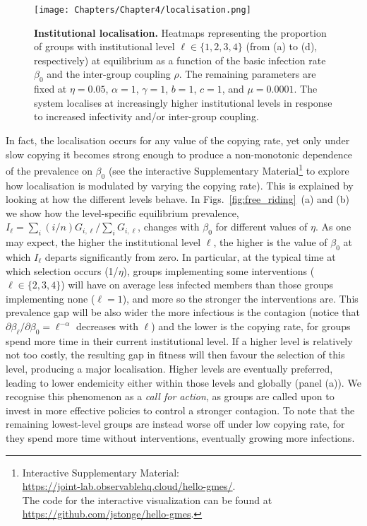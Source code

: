 \begin{figure}
  \centering	
    \texttt{[image: Chapters/Chapter4/localisation.png]}  
  \caption[Institutional localisation]{  \textbf{Institutional localisation.} Heatmaps representing the proportion of groups with institutional level $\ell\in\{1,2,3,4\}$ (from (a) to (d), respectively) at equilibrium as a function of the basic infection rate $\beta_0$ and the inter-group coupling $\rho$.
  The remaining parameters are fixed at $\eta = 0.05$, $\alpha=1$, $\gamma=1$, $b=1$, $c=1$, and $\mu = 0.0001$. The system localises at increasingly higher institutional levels in response to increased infectivity and/or inter-group coupling.
  }
  \label{fig:localisation}
\end{figure}

In fact, the localisation occurs for any value of the copying rate, yet only under slow copying it becomes strong enough to produce a non-monotonic dependence of the prevalence on $\beta_0$ (see the interactive Supplementary Material\footnote{Interactive Supplementary Material:\\ \href{https://joint-lab.observablehq.cloud/hello-gmes/}{https://joint-lab.observablehq.cloud/hello-gmes/}.\\ The code for the interactive visualization can be found at \href{https://github.com/jstonge/hello-gmes}{https://github.com/jstonge/hello-gmes}.} to explore how localisation is modulated by varying the copying rate). This is explained by looking at how the different levels behave. In Figs.~\ref{fig:free_riding}~(a) and (b) we show how the level-specific equilibrium prevalence, $I_\ell = \sum _i (i/n) G_{i,\ell} / \sum _i G_{i,\ell}$, changes with $\beta_0$ for different values of $\eta$. As one may expect, the higher the institutional level $\ell$, the higher is the value of $\beta_0$ at which $I_\ell$ departs significantly from zero. In particular, at the typical time at which selection occurs (1/$\eta$), groups implementing some interventions ($\ell\in\{2,3,4\}$) will have on average less infected members than those groups implementing none ($\ell = 1$), and more so the stronger the interventions are. This prevalence gap will be also wider the more infectious is the contagion (notice that $\partial\beta_\ell/\partial\beta_0 = \ell^{-\alpha}$ decreases with $\ell$) and the lower is the copying rate, for groups spend more time in their current institutional level. If a higher level is relatively not too costly, the resulting gap in fitness will then favour the selection of this level, producing a major localisation. Higher levels are eventually preferred, leading to lower endemicity either within those levels and globally (panel (a)). We recognise this phenomenon as a \emph{call for action}, as groups are called upon to invest in more effective policies to control a stronger contagion. To note that the remaining lowest-level groups are instead worse off under low copying rate, for they spend more time without interventions, eventually growing more infections. 

